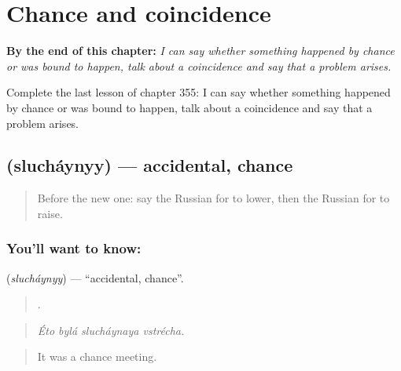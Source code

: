 
\chapter{Chance and coincidence}
\label{ch:ru-chance-and-coincidence}

\begin{chapteropening}
\textbf{By the end of this chapter:} \emph{I can say whether something happened by chance or was bound to happen, talk about a coincidence and say that a problem arises.}

Complete the last lesson of chapter 355: I can say whether something happened by chance or was bound to happen, talk about a coincidence and say that a problem arises.
\end{chapteropening}

\section[\texorpdfstring{\ru{случайный} (slucháynyy)}{случайный (slucháynyy)}]{ (slucháynyy) — accidental, chance}

\label{lesson:RU-C355-sluchaynyy}



\begin{quote}
Before the new one: say the Russian for to lower, then the Russian for to raise.
\end{quote}

\subsection*{You'll want to know: }
\textbf{} (\emph{slucháynyy}) — \textquotedblleft{}accidental, chance\textquotedblright{}.

\begin{quote}
   .
\end{quote}

\begin{quote}
\emph{Éto bylá slucháynaya vstrécha.}
\end{quote}

\begin{quote}
It was a chance meeting.
\end{quote}

